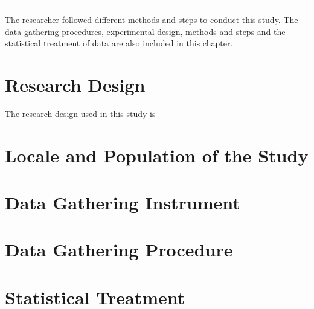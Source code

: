
\vspace{-1cm}\noindent\rule{\textwidth}{0.4pt}

The researcher followed different methods and 
steps to conduct this study. The data gathering
procedures, experimental design, methods and steps 
and the statistical treatment of data are also 
included in this chapter.

\section{Research Design}
The research design used in this study is 

\section{Locale and Population of the Study}

\section{Data Gathering Instrument}

\section{Data Gathering Procedure}

\section{Statistical Treatment}